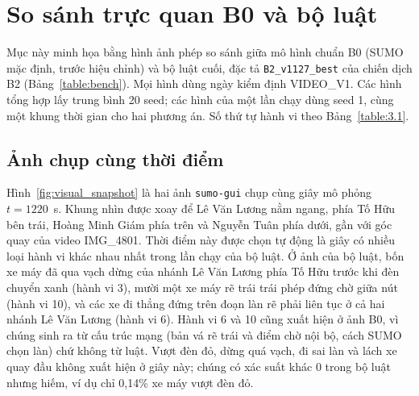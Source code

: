 \section{So sánh trực quan B0 và bộ luật}
\label{section:visual}

Mục này minh họa bằng hình ảnh phép so sánh giữa mô hình chuẩn B0 (SUMO mặc định, trước hiệu chỉnh) và bộ luật cuối, đặc tả \texttt{B2\_v1127\_best} của chiến dịch B2 (Bảng~\ref{table:bench}). Mọi hình dùng ngày kiểm định VIDEO\_V1. Các hình tổng hợp lấy trung bình 20 seed; các hình của một lần chạy dùng seed 1, cùng một khung thời gian cho hai phương án. Số thứ tự hành vi theo Bảng~\ref{table:3.1}.

\subsection{Ảnh chụp cùng thời điểm}

Hình~\ref{fig:visual_snapshot} là hai ảnh \texttt{sumo-gui} chụp cùng giây mô phỏng $t = 1220$~s. Khung nhìn được xoay để Lê Văn Lương nằm ngang, phía Tố Hữu bên trái, Hoàng Minh Giám phía trên và Nguyễn Tuân phía dưới, gần với góc quay của video IMG\_4801. Thời điểm này được chọn tự động là giây có nhiều loại hành vi khác nhau nhất trong lần chạy của bộ luật. Ở ảnh của bộ luật, bốn xe máy đã qua vạch dừng của nhánh Lê Văn Lương phía Tố Hữu trước khi đèn chuyển xanh (hành vi 3), mười một xe máy rẽ trái trái phép đứng chờ giữa nút (hành vi 10), và các xe đi thẳng đứng trên đoạn làn rẽ phải liên tục ở cả hai nhánh Lê Văn Lương (hành vi 6). Hành vi 6 và 10 cũng xuất hiện ở ảnh B0, vì chúng sinh ra từ cấu trúc mạng (bản vá rẽ trái và điểm chờ nội bộ, cách SUMO chọn làn) chứ không từ luật. Vượt đèn đỏ, dừng quá vạch, đi sai làn và lách xe quay đầu không xuất hiện ở giây này; chúng có xác suất khác 0 trong bộ luật nhưng hiếm, ví dụ chỉ 0,14\% xe máy vượt đèn đỏ.

